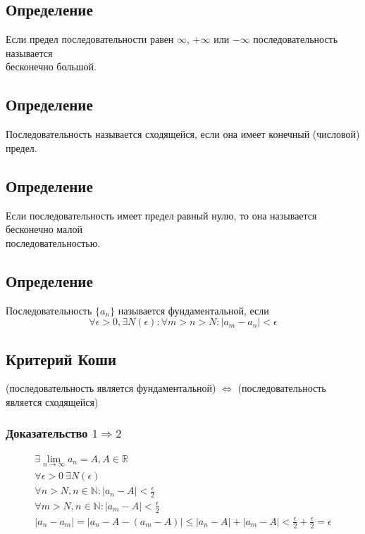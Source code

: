 \documentclass{article}
\begin{document}
\subsection{Определение}
Если предел последовательности равен $\infty$, $+\infty$ или $-\infty$ последовательность называется \\
бесконечно большой.


\subsection{Определение}
Последовательность называется сходящейся, если она имеет конечный (числовой) предел.


\subsection{Определение}
Если последовательность имеет предел равный нулю, то она называется бесконечно малой \\
последовательностью.


\subsection{Определение}
Последовательность $\{a_n\}$ называется фундаментальной, если 
\[
\forall\epsilon > 0, \exists{N(\epsilon)}: \forall{m} > n > N: |a_m - a_n| < \epsilon
\]


\subsection{Критерий Коши} 
(последовательность является фундаментальной) $\Leftrightarrow$ (последовательность является сходящейся)

\subsubsection{Доказательство $1 \Rightarrow 2$}
\begin{gather*}
    \exists \lim_{n\to\infty} a_n = A, A \in \mathbb{R} \\
    \forall\epsilon > 0~\exists{N(\epsilon)} \\
    \forall{n} > N, n \in \mathbb{N}: |a_n - A| < \frac{\epsilon}{2} \\
    \forall{m} > N, n \in \mathbb{N}: |a_m - A| < \frac{\epsilon}{2} \\
    |a_n - a_m| = |a_n - A - (a_m - A)| \le |a_n - A| + |a_m - A| < \frac{\epsilon}{2} + \frac{\epsilon}{2} = \epsilon \\
\end{gather*}
\end{document}
